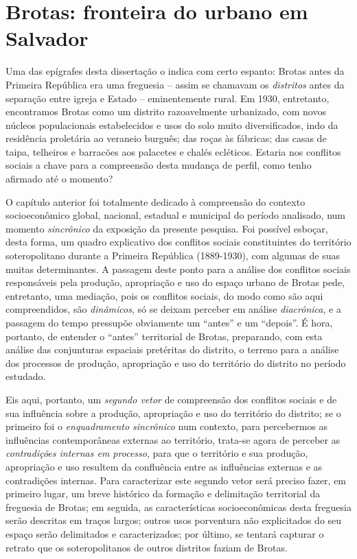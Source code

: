\chapter{Brotas: fronteira do urbano em Salvador}\label{cap:2}

Uma das epígrafes desta dissertação o indica com certo espanto: Brotas antes da Primeira República era uma freguesia -- assim se chamavam os \textit{distritos} antes da separação entre igreja e Estado -- eminentemente rural. Em 1930, entretanto, encontramos Brotas como um distrito razoavelmente urbanizado, com novos núcleos populacionais estabelecidos e usos do solo muito diversificados, indo da residência proletária ao veraneio burguês; das roças às fábricas; das casas de taipa, telheiros e barracões aos palacetes e chalés ecléticos. Estaria nos conflitos sociais a chave para a compreensão desta mudança de perfil, como tenho afirmado até o momento?

O capítulo anterior foi totalmente dedicado à compreensão do contexto socioeconômico global, nacional, estadual e municipal do período analisado, num momento \textit{sincrônico} da exposição da presente pesquisa. Foi possível esboçar, desta forma, um quadro explicativo dos conflitos sociais constituintes do território soteropolitano durante a Primeira República (1889-1930), com algumas de suas muitas determinantes. A passagem deste ponto para a análise dos conflitos sociais responsáveis pela produção, apropriação e uso do espaço urbano de Brotas pede, entretanto, uma mediação, pois os conflitos sociais, do modo como são aqui compreendidos, são \textit{dinâmicos}, só se deixam perceber em análise \textit{diacrônica}, e a passagem do tempo pressupõe obviamente um ``antes'' e um ``depois''. É hora, portanto, de entender o ``antes'' territorial de Brotas, preparando, com esta análise das conjunturas espaciais pretéritas do distrito, o terreno para a análise dos processos de produção, apropriação e uso do território do distrito no período estudado. 

Eis aqui, portanto, um \textit{segundo vetor} de compreensão dos conflitos sociais e de sua influência sobre a produção, apropriação e uso do território do distrito; se o primeiro foi o \textit{enquadramento sincrônico} num contexto, para percebermos as influências contemporâneas externas ao território, trata-se agora de perceber as \textit{contradições internas em processo}, para que o território e sua produção, apropriação e uso resultem da confluência entre as influências externas e as contradições internas. Para caracterizar este segundo vetor será preciso fazer, em primeiro lugar, um breve histórico da formação e delimitação territorial da freguesia de Brotas; em seguida, as características socioeconômicas desta freguesia serão descritas em traços largos; outros usos porventura não explicitados do seu espaço serão delimitados e caracterizados; por último, se tentará capturar o retrato que os soteropolitanos de outros distritos faziam de Brotas. 

